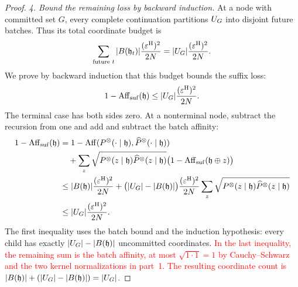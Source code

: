 \begin{proof}
\emph{4. Bound the remaining loss by backward induction.}
At a node with committed set $G$, every complete continuation partitions
$\ResidualPositions$ into disjoint future batches.  Thus its total
coordinate budget is
\begin{equation}
 \sum_{\text{future }t}|B(\mathfrak h_t)|
       \frac{(\OracleRadius)^2}{2N}
 =|\ResidualPositions|\frac{(\OracleRadius)^2}{2N}.
 \label{app:eq:remaining-path-budget}
\end{equation}
We prove by backward induction that this budget bounds the suffix loss:
\begin{equation}
 1-\SuffixAffinity{\mathfrak h}
 \le|\ResidualPositions|\frac{(\OracleRadius)^2}{2N}.
 \label{app:eq:adaptive-affinity-induction}
\end{equation}
The terminal case has both sides zero.  At a nonterminal node, subtract
the recursion from one and add and subtract the batch affinity:
\begin{align*}
 1-\SuffixAffinity{\mathfrak h}
 &=1-\HellingerAffinity(\ExactBatchLaw{\mathfrak h},
                        \OracleBatchLaw{\mathfrak h})\\
 &\quad+\sum_z
   \sqrt{\ExactBatchMass{\mathfrak h}{z}\OracleBatchMass{\mathfrak h}{z}}
        \bigl(1-\SuffixAffinity{\mathfrak h\oplus z}\bigr)\\
 &\le |B(\mathfrak h)|\frac{(\OracleRadius)^2}{2N}
   +\bigl(|\ResidualPositions|-|B(\mathfrak h)|\bigr)
      \frac{(\OracleRadius)^2}{2N}
      \sum_z\sqrt{\ExactBatchMass{\mathfrak h}{z}
                  \OracleBatchMass{\mathfrak h}{z}}\\
 &\le|\ResidualPositions|\frac{(\OracleRadius)^2}{2N}.
\end{align*}
The first inequality uses the batch bound and the induction hypothesis:
every child has exactly $|\ResidualPositions|-|B(\mathfrak h)|$
uncommitted coordinates.  \textcolor{red}{In the last inequality, the
remaining sum is the batch affinity, at most $\sqrt{1\cdot1}=1$ by
Cauchy--Schwarz and the two kernel normalizations in part~1.  The resulting
coordinate count is $|B(\mathfrak h)|+(|\ResidualPositions|-|B(\mathfrak h)|)
=|\ResidualPositions|$.}



\end{proof}
